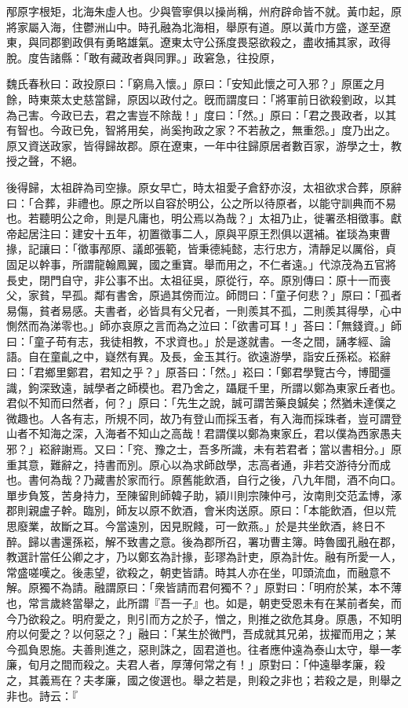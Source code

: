 
\begin{pinyinscope}
邴原字根矩，北海朱虛人也。少與管寧俱以操尚稱，州府辟命皆不就。黃巾起，原將家屬入海，住鬱洲山中。時孔融為北海相，舉原有道。原以黃巾方盛，遂至遼東，與同郡劉政俱有勇略雄氣。遼東太守公孫度畏惡欲殺之，盡收捕其家，政得脫。度告諸縣：「敢有藏政者與同罪。」政窘急，往投原，

魏氏春秋曰：政投原曰：「窮鳥入懷。」原曰：「安知此懷之可入邪？」原匿之月餘，時東萊太史慈當歸，原因以政付之。旣而謂度曰：「將軍前日欲殺劉政，以其為己害。今政已去，君之害豈不除哉！」度曰：「然。」原曰：「君之畏政者，以其有智也。今政已免，智將用矣，尚奚拘政之家？不若赦之，無重怨。」度乃出之。原又資送政家，皆得歸故郡。原在遼東，一年中往歸原居者數百家，游學之士，教授之聲，不絕。

後得歸，太祖辟為司空掾。原女早亡，時太祖愛子倉舒亦沒，太祖欲求合葬，原辭曰：「合葬，非禮也。原之所以自容於明公，公之所以待原者，以能守訓典而不易也。若聽明公之命，則是凡庸也，明公焉以為哉？」太祖乃止，徙署丞相徵事。獻帝起居注曰：建安十五年，初置徵事二人，原與平原王烈俱以選補。崔琰為東曹掾，記讓曰：「徵事邴原、議郎張範，皆秉德純懿，志行忠方，清靜足以厲俗，貞固足以幹事，所謂龍翰鳳翼，國之重寶。舉而用之，不仁者遠。」代涼茂為五官將長史，閉門自守，非公事不出。太祖征吳，原從行，卒。原別傳曰：原十一而喪父，家貧，早孤。鄰有書舍，原過其傍而泣。師問曰：「童子何悲？」原曰：「孤者易傷，貧者易感。夫書者，必皆具有父兄者，一則羨其不孤，二則羨其得學，心中惻然而為涕零也。」師亦哀原之言而為之泣曰：「欲書可耳！」荅曰：「無錢資。」師曰：「童子苟有志，我徒相教，不求資也。」於是遂就書。一冬之間，誦孝經、論語。自在童齓之中，嶷然有異。及長，金玉其行。欲遠游學，詣安丘孫崧。崧辭曰：「君鄉里鄭君，君知之乎？」原荅曰：「然。」崧曰：「鄭君學覽古今，博聞彊識，鉤深致遠，誠學者之師模也。君乃舍之，躡屣千里，所謂以鄭為東家丘者也。君似不知而曰然者，何？」原曰：「先生之說，誠可謂苦藥良鍼矣；然猶未達僕之微趣也。人各有志，所規不同，故乃有登山而採玉者，有入海而採珠者，豈可謂登山者不知海之深，入海者不知山之高哉！君謂僕以鄭為東家丘，君以僕為西家愚夫邪？」崧辭謝焉。又曰：「兖、豫之士，吾多所識，未有若君者；當以書相分。」原重其意，難辭之，持書而別。原心以為求師啟學，志高者通，非若交游待分而成也。書何為哉？乃藏書於家而行。原舊能飲酒，自行之後，八九年間，酒不向口。單步負笈，苦身持力，至陳留則師韓子助，潁川則宗陳仲弓，汝南則交范孟博，涿郡則親盧子幹。臨別，師友以原不飲酒，會米肉送原。原曰：「本能飲酒，但以荒思廢業，故斷之耳。今當遠別，因見貺餞，可一飲燕。」於是共坐飲酒，終日不醉。歸以書還孫崧，解不致書之意。後為郡所召，署功曹主簿。時魯國孔融在郡，教選計當任公卿之才，乃以鄭玄為計掾，彭璆為計吏，原為計佐。融有所愛一人，常盛嗟嘆之。後恚望，欲殺之，朝吏皆請。時其人亦在坐，叩頭流血，而融意不解。原獨不為請。融謂原曰：「衆皆請而君何獨不？」原對曰：「明府於某，本不薄也，常言歲終當舉之，此所謂『吾一子』也。如是，朝吏受恩未有在某前者矣，而今乃欲殺之。明府愛之，則引而方之於子，憎之，則推之欲危其身。原愚，不知明府以何愛之？以何惡之？」融曰：「某生於微門，吾成就其兄弟，拔擢而用之；某今孤負恩施。夫善則進之，惡則誅之，固君道也。往者應仲遠為泰山太守，舉一孝廉，旬月之間而殺之。夫君人者，厚薄何常之有！」原對曰：「仲遠舉孝廉，殺之，其義焉在？夫孝廉，國之俊選也。舉之若是，則殺之非也；若殺之是，則舉之非也。詩云：『
\end{pinyinscope}
